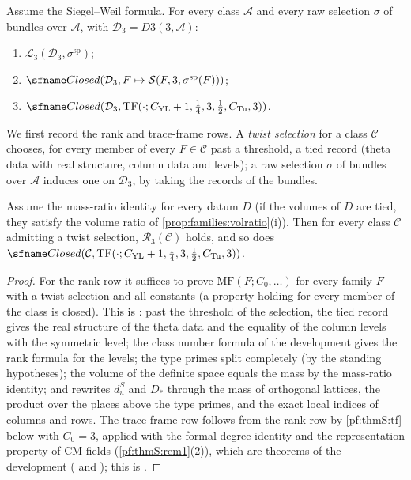 \begin{proposition}\label{pf:thmS:atchoice}
Assume the Siegel--Weil formula. For every class $\mathcal A$ and every raw selection $\sigma$ of bundles over
$\mathcal A$, with $\mathcal D_3=D3(3,\mathcal A)$:
\begin{enumerate}
\item $\mathcal{L}_{3}(\mathcal D_3,\sigma^{\mathrm{sp}})$;
\item $\thmSClosed(\mathcal D_3,F\mapsto\mathcal{S}(F,3,\sigma^{\mathrm{sp}}(F)))$;
\item $\thmSClosed(\mathcal D_3,\mathrm{TF}(\cdot;C_{\mathrm{YL}}+1,\tfrac14,3,\tfrac12,C_{\mathrm{Tu}},3))$.
\end{enumerate}
\end{proposition}

We first record the rank and trace-frame rows. A \emph{twist selection} for a class $\mathcal C$ chooses, for every
member of every $F\in\mathcal C$ past a threshold, a tied record (theta data with real structure, column data and
levels); a raw selection $\sigma$ of bundles over $\mathcal A$ induces one on $\mathcal D_3$, by taking the records
of the bundles.

\begin{lemma}\label{pf:thmS:ranks}
Assume the mass-ratio identity for every datum $D$ (if the volumes of $D$ are tied, they satisfy the volume ratio of \cref{prop:families:volratio}(i)). Then for every class $\mathcal C$ admitting a twist selection,
$\mathcal{R}_{3}(\mathcal C)$ holds, and so does
$\thmSClosed(\mathcal C,\mathrm{TF}(\cdot;C_{\mathrm{YL}}+1,\tfrac14,3,\tfrac12,C_{\mathrm{Tu}},3))$.
\end{lemma}

\begin{proof}
For the rank row it suffices to prove $\mathrm{MF}(F;C_0,\dots)$ for every family $F$ with a twist selection and
all constants (a property holding for every member of the class is closed). This is
: past the threshold of the selection, the tied record
gives the real structure of the theta data and the equality of the column levels with the symmetric level; the
class number formula of the development gives the rank formula for the levels; the type primes split
completely (by the standing hypotheses); the volume of the definite space equals the mass by the mass-ratio
identity; and  rewrites $d^S_u$ and $D_*$ through the mass of orthogonal
lattices, the product over the places above the type primes, and the exact local indices of columns and rows. The
trace-frame row follows from the rank row by \cref{pf:thmS:tf} below with $C_0=3$, applied with the formal-degree identity and the representation property of CM fields (\cref{pf:thmS:rem1}(2)), which are theorems of the development
( and ); this is
.
\end{proof}

